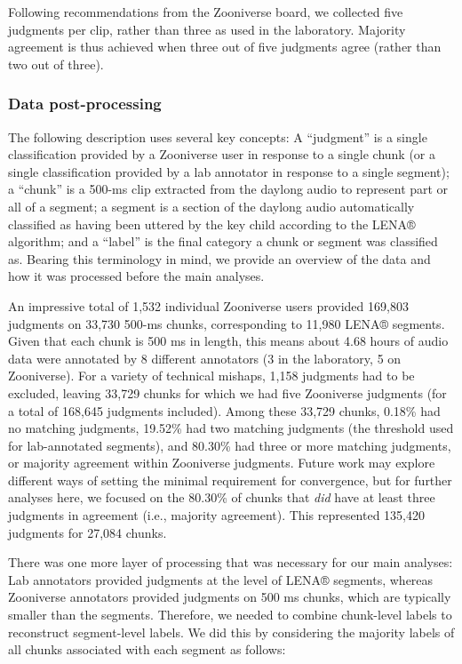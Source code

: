 \documentclass[english,,man]{apa6}
\begin{document}
Following recommendations from the Zooniverse board, we collected five judgments per clip, rather than three as used in the laboratory. Majority agreement is thus achieved when three out of five judgments agree (rather than two out of three).

\hypertarget{data-post-processing}{%
\subsubsection{Data post-processing}\label{data-post-processing}}

The following description uses several key concepts: A \enquote{judgment} is a single classification provided by a Zooniverse user in response to a single chunk (or a single classification provided by a lab annotator in response to a single segment); a \enquote{chunk} is a 500-ms clip extracted from the daylong audio to represent part or all of a segment; a segment is a section of the daylong audio automatically classified as having been uttered by the key child according to the LENA® algorithm; and a \enquote{label} is the final category a chunk or segment was classified as. Bearing this terminology in mind, we provide an overview of the data and how it was processed before the main analyses.

An impressive total of 1,532 individual Zooniverse users provided 169,803 judgments on 33,730 500-ms chunks, corresponding to 11,980 LENA® segments. Given that each chunk is 500 ms in length, this means about 4.68 hours of audio data were annotated by 8 different annotators (3 in the laboratory, 5 on Zooniverse). For a variety of technical mishaps, 1,158 judgments had to be excluded, leaving 33,729 chunks for which we had five Zooniverse judgments (for a total of 168,645 judgments included). Among these 33,729 chunks, 0.18\% had no matching judgments, 19.52\% had two matching judgments (the threshold used for lab-annotated segments), and 80.30\% had three or more matching judgments, or majority agreement within Zooniverse judgments. Future work may explore different ways of setting the minimal requirement for convergence, but for further analyses here, we focused on the 80.30\% of chunks that \emph{did} have at least three judgments in agreement (i.e., majority agreement). This represented 135,420 judgments for 27,084 chunks.

There was one more layer of processing that was necessary for our main analyses: Lab annotators provided judgments at the level of LENA® segments, whereas Zooniverse annotators provided judgments on 500 ms chunks, which are typically smaller than the segments. Therefore, we needed to combine chunk-level labels to reconstruct segment-level labels. We did this by considering the majority labels of all chunks associated with each segment as follows:
\end{document}
